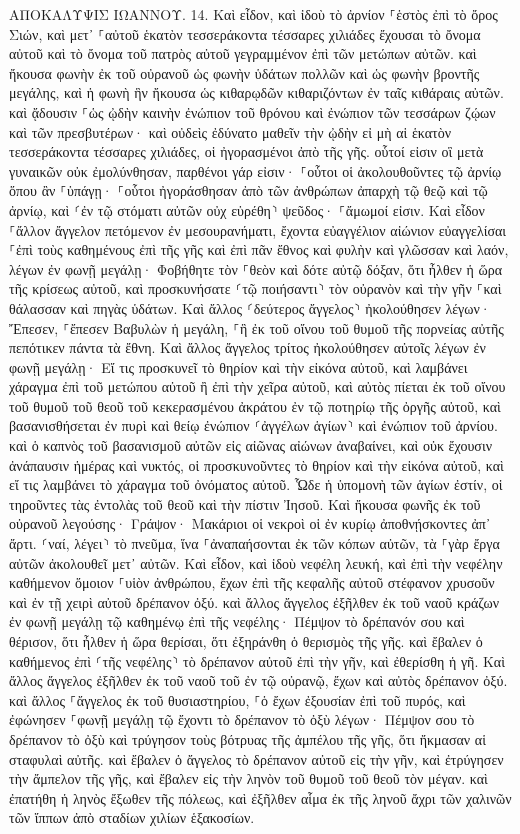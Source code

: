 \documentclass[twoside, 9pt]{extreport}
\begin{document}
ΑΠΟΚΑΛΥΨΙΣ ΙΩΑΝΝΟΥ.
14.
Καὶ εἶδον, καὶ ἰδοὺ τὸ ἀρνίον ⸀ἑστὸς ἐπὶ τὸ ὄρος Σιών, καὶ μετ᾽ ⸀αὐτοῦ ἑκατὸν τεσσεράκοντα τέσσαρες χιλιάδες ἔχουσαι τὸ ὄνομα αὐτοῦ καὶ τὸ ὄνομα τοῦ πατρὸς αὐτοῦ γεγραμμένον ἐπὶ τῶν μετώπων αὐτῶν. 
καὶ ἤκουσα φωνὴν ἐκ τοῦ οὐρανοῦ ὡς φωνὴν ὑδάτων πολλῶν καὶ ὡς φωνὴν βροντῆς μεγάλης, καὶ ἡ φωνὴ ἣν ἤκουσα ὡς κιθαρῳδῶν κιθαριζόντων ἐν ταῖς κιθάραις αὐτῶν. 
καὶ ᾄδουσιν ⸀ὡς ᾠδὴν καινὴν ἐνώπιον τοῦ θρόνου καὶ ἐνώπιον τῶν τεσσάρων ζῴων καὶ τῶν πρεσβυτέρων· καὶ οὐδεὶς ἐδύνατο μαθεῖν τὴν ᾠδὴν εἰ μὴ αἱ ἑκατὸν τεσσεράκοντα τέσσαρες χιλιάδες, οἱ ἠγορασμένοι ἀπὸ τῆς γῆς. 
οὗτοί εἰσιν οἳ μετὰ γυναικῶν οὐκ ἐμολύνθησαν, παρθένοι γάρ εἰσιν· ⸀οὗτοι οἱ ἀκολουθοῦντες τῷ ἀρνίῳ ὅπου ἂν ⸀ὑπάγῃ· ⸀οὗτοι ἠγοράσθησαν ἀπὸ τῶν ἀνθρώπων ἀπαρχὴ τῷ θεῷ καὶ τῷ ἀρνίῳ, 
καὶ ⸂ἐν τῷ στόματι αὐτῶν οὐχ εὑρέθη⸃ ψεῦδος· ⸀ἄμωμοί εἰσιν. 
Καὶ εἶδον ⸀ἄλλον ἄγγελον πετόμενον ἐν μεσουρανήματι, ἔχοντα εὐαγγέλιον αἰώνιον εὐαγγελίσαι ⸀ἐπὶ τοὺς καθημένους ἐπὶ τῆς γῆς καὶ ἐπὶ πᾶν ἔθνος καὶ φυλὴν καὶ γλῶσσαν καὶ λαόν, 
λέγων ἐν φωνῇ μεγάλῃ· Φοβήθητε τὸν ⸀θεὸν καὶ δότε αὐτῷ δόξαν, ὅτι ἦλθεν ἡ ὥρα τῆς κρίσεως αὐτοῦ, καὶ προσκυνήσατε ⸂τῷ ποιήσαντι⸃ τὸν οὐρανὸν καὶ τὴν γῆν ⸀καὶ θάλασσαν καὶ πηγὰς ὑδάτων. 
Καὶ ἄλλος ⸂δεύτερος ἄγγελος⸃ ἠκολούθησεν λέγων· Ἔπεσεν, ⸀ἔπεσεν Βαβυλὼν ἡ μεγάλη, ⸀ἣ ἐκ τοῦ οἴνου τοῦ θυμοῦ τῆς πορνείας αὐτῆς πεπότικεν πάντα τὰ ἔθνη. 
Καὶ ἄλλος ἄγγελος τρίτος ἠκολούθησεν αὐτοῖς λέγων ἐν φωνῇ μεγάλῃ· Εἴ τις προσκυνεῖ τὸ θηρίον καὶ τὴν εἰκόνα αὐτοῦ, καὶ λαμβάνει χάραγμα ἐπὶ τοῦ μετώπου αὐτοῦ ἢ ἐπὶ τὴν χεῖρα αὐτοῦ, 
καὶ αὐτὸς πίεται ἐκ τοῦ οἴνου τοῦ θυμοῦ τοῦ θεοῦ τοῦ κεκερασμένου ἀκράτου ἐν τῷ ποτηρίῳ τῆς ὀργῆς αὐτοῦ, καὶ βασανισθήσεται ἐν πυρὶ καὶ θείῳ ἐνώπιον ⸂ἀγγέλων ἁγίων⸃ καὶ ἐνώπιον τοῦ ἀρνίου. 
καὶ ὁ καπνὸς τοῦ βασανισμοῦ αὐτῶν εἰς αἰῶνας αἰώνων ἀναβαίνει, καὶ οὐκ ἔχουσιν ἀνάπαυσιν ἡμέρας καὶ νυκτός, οἱ προσκυνοῦντες τὸ θηρίον καὶ τὴν εἰκόνα αὐτοῦ, καὶ εἴ τις λαμβάνει τὸ χάραγμα τοῦ ὀνόματος αὐτοῦ. 
Ὧδε ἡ ὑπομονὴ τῶν ἁγίων ἐστίν, οἱ τηροῦντες τὰς ἐντολὰς τοῦ θεοῦ καὶ τὴν πίστιν Ἰησοῦ. 
Καὶ ἤκουσα φωνῆς ἐκ τοῦ οὐρανοῦ λεγούσης· Γράψον· Μακάριοι οἱ νεκροὶ οἱ ἐν κυρίῳ ἀποθνῄσκοντες ἀπ᾽ ἄρτι. ⸂ναί, λέγει⸃ τὸ πνεῦμα, ἵνα ⸀ἀναπαήσονται ἐκ τῶν κόπων αὐτῶν, τὰ ⸀γὰρ ἔργα αὐτῶν ἀκολουθεῖ μετ᾽ αὐτῶν. 
Καὶ εἶδον, καὶ ἰδοὺ νεφέλη λευκή, καὶ ἐπὶ τὴν νεφέλην καθήμενον ὅμοιον ⸀υἱὸν ἀνθρώπου, ἔχων ἐπὶ τῆς κεφαλῆς αὐτοῦ στέφανον χρυσοῦν καὶ ἐν τῇ χειρὶ αὐτοῦ δρέπανον ὀξύ. 
καὶ ἄλλος ἄγγελος ἐξῆλθεν ἐκ τοῦ ναοῦ κράζων ἐν φωνῇ μεγάλῃ τῷ καθημένῳ ἐπὶ τῆς νεφέλης· Πέμψον τὸ δρέπανόν σου καὶ θέρισον, ὅτι ἦλθεν ἡ ὥρα θερίσαι, ὅτι ἐξηράνθη ὁ θερισμὸς τῆς γῆς. 
καὶ ἔβαλεν ὁ καθήμενος ἐπὶ ⸂τῆς νεφέλης⸃ τὸ δρέπανον αὐτοῦ ἐπὶ τὴν γῆν, καὶ ἐθερίσθη ἡ γῆ. 
Καὶ ἄλλος ἄγγελος ἐξῆλθεν ἐκ τοῦ ναοῦ τοῦ ἐν τῷ οὐρανῷ, ἔχων καὶ αὐτὸς δρέπανον ὀξύ. 
καὶ ἄλλος ⸀ἄγγελος ἐκ τοῦ θυσιαστηρίου, ⸀ὁ ἔχων ἐξουσίαν ἐπὶ τοῦ πυρός, καὶ ἐφώνησεν ⸀φωνῇ μεγάλῃ τῷ ἔχοντι τὸ δρέπανον τὸ ὀξὺ λέγων· Πέμψον σου τὸ δρέπανον τὸ ὀξὺ καὶ τρύγησον τοὺς βότρυας τῆς ἀμπέλου τῆς γῆς, ὅτι ἤκμασαν αἱ σταφυλαὶ αὐτῆς. 
καὶ ἔβαλεν ὁ ἄγγελος τὸ δρέπανον αὐτοῦ εἰς τὴν γῆν, καὶ ἐτρύγησεν τὴν ἄμπελον τῆς γῆς, καὶ ἔβαλεν εἰς τὴν ληνὸν τοῦ θυμοῦ τοῦ θεοῦ τὸν μέγαν. 
καὶ ἐπατήθη ἡ ληνὸς ἔξωθεν τῆς πόλεως, καὶ ἐξῆλθεν αἷμα ἐκ τῆς ληνοῦ ἄχρι τῶν χαλινῶν τῶν ἵππων ἀπὸ σταδίων χιλίων ἑξακοσίων. 
\end{document}
